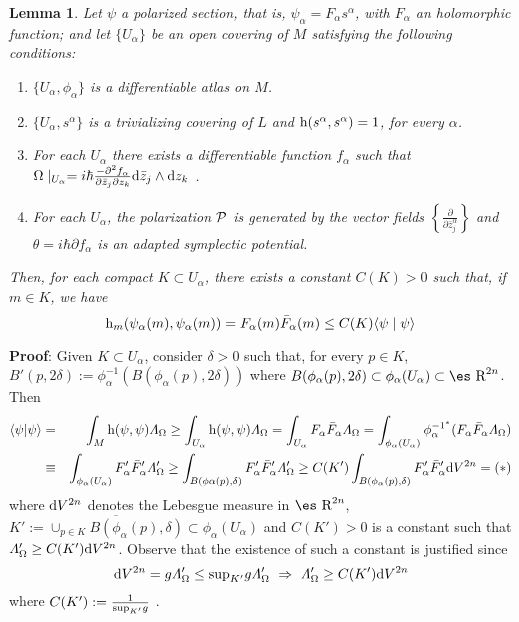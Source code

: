 \documentclass[12pt]{article}
\newtheorem{lem}{Lemma}
\def\beann{\begin{eqnarray*}}
\def\eeann{\end{eqnarray*}}
\def\dst{\(}
\def\derpar#1#2{\frac{\partial{#1}}{\partial{#2}}}
\def\d{{\rm d}}
\def\P{{\cal P}}
\def\h{{\rm h}}
\def\Real{\mbox{\es R}}
\def\LF{{\mit\Lambda}_{\Omega}}
\begin{document}
\begin{lem}
Let $\psi$ a polarized section,
that is, $\psi_\alpha = F_\alpha s^\alpha$,
with $F_\alpha$ an holomorphic function;
and let $\{U_\alpha\}$ be an open covering of $M$
satisfying the following conditions:
\begin{enumerate}
\item
$\{ U_\alpha ,\phi_\alpha \}$ is a differentiable atlas on $M$.
\item
$\{ U_\alpha ,s^\alpha \}$ is a trivializing covering of $L$ and
$\h (s^\alpha ,s^\alpha ) = 1$, for every $\alpha$.
\item
For each $U_\alpha$ there exists a differentiable function
$f_\alpha$ such that
\dst  \Omega \mid _{U_\alpha} =
i \hbar\frac{-\partial^2 f_\alpha}{\partial \bar z_j \partial z_k}
\d \bar z_j \wedge \d z_k\) .
\item
For each $U_\alpha$, the polarization $\P$ is generated by the
vector fields \dst\left\{ \derpar{}{\bar z_j^\alpha}\right\}\)
and $\theta = i\hbar \partial f_\alpha$
is an adapted symplectic potential.
\end{enumerate}
Then, for each compact $K \subset U_\alpha$,
there exists a constant $C(K)>0$ such that,
if $m \in K$, we have
$$
\h_m (\psi_\alpha (m) , \psi_\alpha (m))
= F_\alpha (m) \bar F_\alpha (m)
\leq C(K) \langle \psi \mid \psi \rangle
$$
\end{lem}
{\bf Proof}:
Given $K \subset U_\alpha$, consider $\delta >0$ such that,
for every $p \in K$,
$B'(p,2\delta ) := \phi_\alpha^{-1}(B(\phi_\alpha (p),2\delta ))$
where
$B(\phi_\alpha (p),2\delta ) \subset \phi_\alpha(U_\alpha )
\subset \Real^{2n}$.
Then
\beann
\langle \psi | \psi \rangle &=&
\int_M \h (\psi ,\psi ) \LF
\geq
\int_{U_\alpha} \h (\psi ,\psi ) \LF =
\int_{U_\alpha} F_\alpha \bar F_\alpha \LF =
\int_{\phi_\alpha (U_\alpha )}\phi_\alpha^{{-1}^*}(F_\alpha \bar
F_\alpha \LF)
\\ &\equiv&
\int_{\phi_\alpha (U_\alpha )}F'_\alpha \bar F'_\alpha \LF '
\geq
\int_{B(\phi\alpha (p),\delta )}F'_\alpha \bar F'_\alpha \LF '
\geq
C(K') \int_{B(\phi_\alpha (p),\delta )}F'_\alpha \bar F'_\alpha \d
V^{2n}
= (*)
\eeann
where $\d V^{2n}$ denotes the Lebesgue measure in $\Real^{2n}$,
 $K':=\overline{\cup_{p\in K}B(\phi_\alpha (p),\delta)}
 \subset\phi_\alpha(U_\alpha)$
and $C(K') > 0$ is a constant such that $\LF ' \geq C(K') \d V^{2n}$.
Observe that the existence of such a constant is justified since
$$
\d V^{2n} = g \LF ' \leq {\rm sup}_{K'} g \LF '
\ \Rightarrow \
\LF ' \geq C(K') \d V^{2n}
$$
where \dst C(K') :=  \frac{1}{{\rm sup}_{K'}g}\) .
\end{document}
